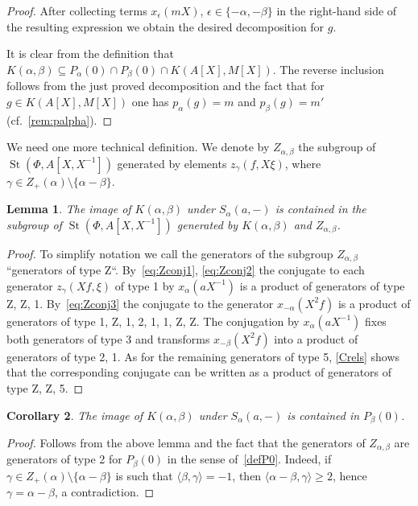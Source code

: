 \documentclass[oneside, 8pt]{amsart}
\newtheorem{lemma}{Lemma}
\newtheorem{corollary}[lemma]{Corollary}
\theoremstyle{remark}
\theoremstyle{definition}
\numberwithin{lemma}{section}
\numberwithin{prop}{section}
\numberwithin{corollary}{section}
\numberwithin{externaltheorem}{section}
\DeclareMathOperator{\St}{St}
\numberwithin{equation}{section}
\begin{document}
\begin{proof}
 After collecting terms $x_\epsilon(mX)$, $\epsilon \in \{ -\alpha, -\beta \}$ in the right-hand side of the resulting expression we obtain the desired decomposition for $g$.
 
 It is clear from the definition that $K(\alpha, \beta) \subseteq P_\alpha(0) \cap P_\beta(0) \cap K(A[X], M[X])$. The reverse inclusion follows from the just proved decomposition and the fact that for $g\in K(A[X], M[X])$ one has $p_{\alpha}(g) = m$ and $p_\beta(g) = m'$ (cf.~\cref{rem:palpha}). \end{proof}
 
We need one more technical definition. We denote by $Z_{\alpha, \beta}$ the subgroup of $\St(\Phi, A[X, X^{-1}])$ generated by elements $z_\gamma(f, X\xi)$, where $\gamma \in Z_+(\alpha) \setminus \{ \alpha - \beta \}$.
  
\begin{lemma} \label{image-K-a-b} The image of $K(\alpha, \beta)$ under $S_{\alpha}(a, -)$ is contained in the subgroup of $\St(\Phi, A[X, X^{-1}])$  generated by $K(\alpha, \beta)$ and $Z_{\alpha, \beta}$. \end{lemma}
\begin{proof} To simplify notation we call the generators of the subgroup $Z_{\alpha,\beta}$ ``generators of type Z``. By~\eqref{eq:Zconj1}, \eqref{eq:Zconj2} the conjugate to each generator $z_\gamma(Xf, \xi)$ of type 1 by $x_\alpha(aX^{-1})$ is a product of generators of type Z, Z, 1.
By~\eqref{eq:Zconj3} the conjugate to the generator $x_{-\alpha}(X^2f)$ is a product of generators of type 1, Z, 1, 2, 1, 1, Z, Z.
The conjugation by $x_\alpha(aX^{-1})$ fixes both generators of type 3 and transforms $x_{-\beta}(X^2f)$ into a product of generators of type 2, 1. As for the remaining generators of type 5, \cref{Crels} shows that the corresponding conjugate can be written as a product of generators of type Z, Z, 5. \end{proof}  

\begin{corollary} The image of $K(\alpha, \beta)$ under $S_\alpha(a, -)$ is contained in $P_\beta(0)$. \end{corollary}
\begin{proof} Follows from the above lemma and the fact that the generators of $Z_{\alpha,\beta}$ are generators of type 2 for $P_\beta(0)$ in the sense of~\cref{defP0}.
 Indeed, if $\gamma \in Z_+(\alpha) \setminus \{ \alpha - \beta \}$ is such that $\langle \beta, \gamma \rangle = -1$, then $ \langle \alpha - \beta, \gamma \rangle \geq 2$, hence
  $\gamma = \alpha - \beta$, a contradiction. \end{proof}
\end{document}
